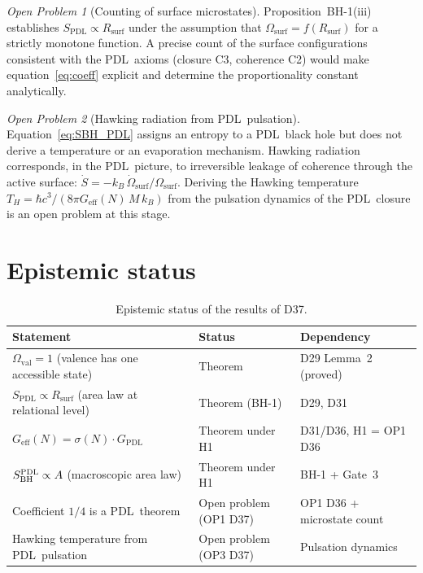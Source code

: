 \documentclass[11pt,a4paper]{article}
\theoremstyle{plain}
\theoremstyle{definition}
\theoremstyle{remark}
\newtheorem{openprob}{Open Problem}
\newcommand{\PDL}{\textsc{PDL}}
\newcommand{\Rsurf}{R_{\mathrm{surf}}}
\newcommand{\sig}{\sigma}
\newcommand{\GPDL}{G_{\mathrm{PDL}}}
\newcommand{\Geff}{G_{\mathrm{eff}}}
\newcommand{\hb}{\hbar}
\newcommand{\SBH}{S_{\mathrm{BH}}}
\newcommand{\SPDL}{S_{\mathrm{PDL}}}
\begin{document}
\begin{openprob}[Counting of surface microstates]
\label{op:counting}
Proposition~BH-1(iii) establishes $\SPDL \propto \Rsurf$ under the assumption that
$\Omega_{\mathrm{surf}} = f(\Rsurf)$ for a strictly monotone function. A precise
count of the surface configurations consistent with the \PDL\ axioms (closure C3,
coherence C2) would make equation~\eqref{eq:coeff} explicit and determine the
proportionality constant analytically.
\end{openprob}

\begin{openprob}[Hawking radiation from \PDL\ pulsation]
\label{op:hawking}
Equation~\eqref{eq:SBH_PDL} assigns an entropy to a \PDL\ black hole but does not
derive a temperature or an evaporation mechanism. Hawking radiation corresponds,
in the \PDL\ picture, to irreversible leakage of coherence through the active
surface: $\dot{S} = -k_B\,\dot{\Omega}_{\mathrm{surf}}/\Omega_{\mathrm{surf}}$.
Deriving the Hawking temperature $T_H = \hb c^3/(8\pi G_{\mathrm{eff}}(N)\,M\,k_B)$
from the pulsation dynamics of the \PDL\ closure is an open problem at this stage.
\end{openprob}

\section{Epistemic status}
\label{sec:epistemic}

\begin{table}[ht]
\centering
\caption{Epistemic status of the results of D37.}
\label{tab:epistemic}
\medskip
\begin{tabular}{>{\raggedright}p{6.2cm}p{3.5cm}p{3.8cm}}
\toprule
Statement & Status & Dependency \\
\midrule
$\Omega_{\mathrm{val}} = 1$ (valence has one accessible state)
  & Theorem
  & D29 Lemma~2 (proved) \\[4pt]
$\SPDL \propto \Rsurf$ (area law at relational level)
  & Theorem (BH-1)
  & D29, D31 \\[4pt]
$\Geff(N) = \sig(N)\cdot\GPDL$
  & Theorem under H1
  & D31/D36, H1 = OP1 D36 \\[4pt]
$\SBH^{\PDL} \propto A$ (macroscopic area law)
  & Theorem under H1
  & BH-1 + Gate~3 \\[4pt]
Coefficient $1/4$ is a \PDL\ theorem
  & Open problem (OP1 D37)
  & OP1 D36 + microstate count \\[4pt]
Hawking temperature from \PDL\ pulsation
  & Open problem (OP3 D37)
  & Pulsation dynamics \\
\bottomrule
\end{tabular}
\end{table}
\end{document}

